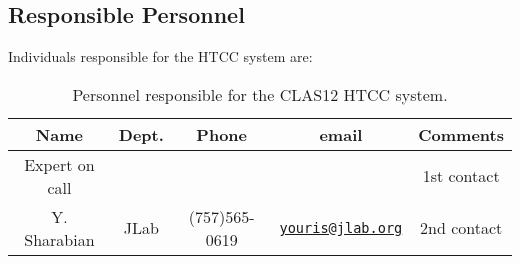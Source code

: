 \subsection{Responsible Personnel}

Individuals responsible for the HTCC system are:

\begin{table}[!htb]
\centering
\begin{tabular}{|c|c|c|c|c|} \hline
Name&Dept.&Phone&email&Comments \\ \hline
Expert on call& &&& 1st contact \\ \hline
Y. Sharabian&JLab&(757)565-0619&\href{mailto:youris@jlab.org}{\nolinkurl{youris@jlab.org}}&2nd contact \\ \hline
\end{tabular}
\caption{Personnel responsible for the CLAS12 HTCC system.} 
\label{tb:htcc}
\end{table}

